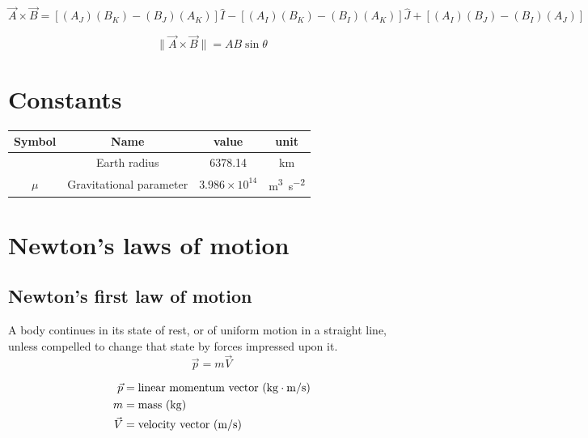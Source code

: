 \documentclass{article}
\begin{document}
	\begin{equation*}
	\boxed{\vec{A} \times \vec{B} = [(A_J)(B_K)-(B_J)(A_K)]\hat{I} - [(A_I)(B_K) - (B_I)(A_K)]\hat{J} + [(A_I)(B_J)-(B_I)(A_J)]}
	\end{equation*}
	
	\begin{equation*}
	\boxed{\lVert\vec{A} \times \vec{B}\rVert = AB\sin\theta}
	\end{equation*}

\section{Constants}
\begin{center}
	\begin{tabular}{|c | c |  c | c |} 
		\hline
		Symbol & Name & value & unit \\ [0.5ex] 
		\hline\hline
		& Earth radius & 6378.14 & km \\ 
		\hline
		$\mu$ & Gravitational parameter & $3.986 \times 10^{14}$ & \si{\meter\cubed\per\second\squared} \\ 
		\hline
	\end{tabular}
\end{center}

\section{Newton's laws of motion}
\subsection{Newton's first law of motion}
\begin{multicols}{2}
A body continues in its state of rest, or of uniform motion in a straight line, unless compelled to change that state by forces impressed upon it.
\vfill\null
\columnbreak
\begin{equation*}
	\boxed{\vec{p} = m\vec{V}}
\end{equation*}

\begin{align*}
\vec{p} &= \text{linear momentum vector (\si{\kilo\gram\meter\per\second})}\\
m &= \text{mass (\si{\kilo\gram})}\\
\vec{V} &= \text{velocity vector (\si{\meter\per\second})}\\
\end{align*}

\end{multicols}
\end{document}
